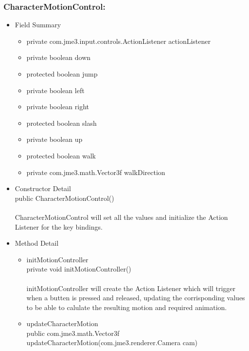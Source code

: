\documentclass[letterpaper]{article}
\begin{document}
				\vspace{0.2in}
				\subsubsection*{CharacterMotionControl:}
				\vspace{0.1in}
					\begin{itemize}
						\item	Field Summary
								\begin{itemize}
									\item	private com.jme3.input.controls.ActionListener	actionListener 
									\item	private boolean	down 
									\item	protected boolean	jump 
									\item	private boolean	left 
									\item	private boolean	right 
									\item	protected boolean	slash 
									\item	private boolean	up 
									\item	protected boolean	walk 
									\item	private com.jme3.math.Vector3f	walkDirection 
								\end{itemize}
						\item	Constructor Detail \\
								public CharacterMotionControl() \\ \\
								CharacterMotionControl will set all the values and initialize the Action Listener for the key bindings.
						\item	Method Detail 
								\begin{itemize}
									\item	initMotionController \\
											private void initMotionController() \\ \\
											initMotionController will create the Action Listener which will trigger when a butten is pressed and released, updating the corrisponding values to be able to calulate the resulting motion and required animation.
									\item	updateCharacterMotion \\
											public com.jme3.math.Vector3f updateCharacterMotion(com.jme3.renderer.Camera cam) \\ \\

\end{itemize}
\end{itemize}
\end{document}
